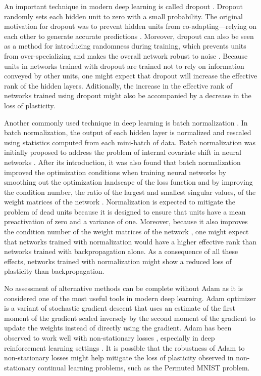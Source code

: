 \documentclass[review, number,3p]{elsarticle}
\begin{document}
An important technique in modern deep learning is called dropout \cite{Hinton2012Dropout1}.
Dropout randomly sets each hidden unit to zero with a small probability. 
The original motivation for dropout was to prevent hidden units from co-adapting---relying on each other to generate accurate predictions \cite{Hinton2012Dropout1}.
Moreover, dropout can also be seen as a method for introducing randomness during training, which prevents units from over-specializing and makes the overall network robust to noise \cite[pp.~255--265]{Goodfellow-et-al-2016}.
Because units in networks trained with dropout are trained not to rely on information conveyed by other units, one might expect that dropout will increase the effective rank of the hidden layers.
Aditionally, the increase in the effective rank of networks trained using dropout might also be accompanied by a decrease in the loss of plasticity.


Another commonly used technique in deep learning is batch normalization \cite{ioffe2015batch}.
In batch normalization, the output of each hidden layer is normalized and rescaled using statistics computed from each mini-batch of data.
Batch normalization was initially proposed to address the problem of internal covariate shift in neural networks \cite{ioffe2015batch}.
After its introduction, it was also found that batch normalization improved the optimization conditions when training neural networks by smoothing out the optimization landscape of the loss function \cite{santurkar2018does} and by improving the condition number, the ratio of the largest and smallest singular values, of the weight matrices of the network \cite{bjork2018}.
Normalization is expected to mitigate the problem of dead units because it is designed to ensure that units have a mean preactivation of zero and a variance of one.
Moreover, because it also improves the condition number of the weight matrices of the network \cite{bjork2018}, one might expect that networks trained with normalization would have a higher effective rank than networks trained with backpropagation alone.
As a consequence of all these effects, networks trained with normalization might show a reduced loss of plasticity than backpropagation.

No assessment of alternative methods can be complete without Adam \cite{kingma2015} as it is considered one of the most useful tools in modern deep learning.
Adam optimizer is a variant of stochastic gradient descent that uses an estimate of the first moment of the gradient scaled inversely by the second moment of the gradient to update the weights instead of directly using the gradient.
Adam has been observed to work well with non-stationary losses \cite{kingma2015}, especially in deep reinforcement learning settings \cite{lillicrap2016, mnih2016, schulman2017}.
It is possible that the robustness of Adam to non-stationary losses might help mitigate the loss of plasticity observed in non-stationary continual learning problems, such as the Permuted MNIST problem.
\end{document}
